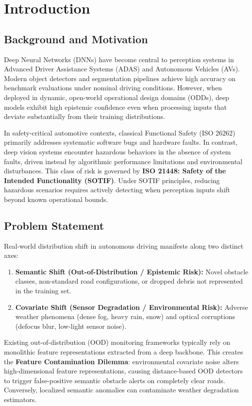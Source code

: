 \chapter{Introduction}
\label{ch:introduction}

\section{Background and Motivation}
Deep Neural Networks (DNNs) have become central to perception systems in Advanced Driver Assistance Systems (ADAS) and Autonomous Vehicles (AVs). Modern object detectors and segmentation pipelines achieve high accuracy on benchmark evaluations under nominal driving conditions. However, when deployed in dynamic, open-world operational design domains (ODDs), deep models exhibit high epistemic confidence even when processing inputs that deviate substantially from their training distributions.

In safety-critical automotive contexts, classical Functional Safety (ISO 26262) primarily addresses systematic software bugs and hardware faults. In contrast, deep vision systems encounter hazardous behaviors in the absence of system faults, driven instead by algorithmic performance limitations and environmental disturbances. This class of risk is governed by \textbf{ISO 21448: Safety of the Intended Functionality (SOTIF)}. Under SOTIF principles, reducing hazardous scenarios requires actively detecting when perception inputs shift beyond known operational bounds.

\section{Problem Statement}
Real-world distribution shift in autonomous driving manifests along two distinct axes:
\begin{enumerate}
    \item \textbf{Semantic Shift (Out-of-Distribution / Epistemic Risk):} Novel obstacle classes, non-standard road configurations, or dropped debris not represented in the training set.
    \item \textbf{Covariate Shift (Sensor Degradation / Environmental Risk):} Adverse weather phenomena (dense fog, heavy rain, snow) and optical corruptions (defocus blur, low-light sensor noise).
\end{enumerate}

Existing out-of-distribution (OOD) monitoring frameworks typically rely on monolithic feature representations extracted from a deep backbone. This creates the \textbf{Feature Contamination Dilemma}: environmental covariate noise alters high-dimensional feature representations, causing distance-based OOD detectors to trigger false-positive semantic obstacle alerts on completely clear roads. Conversely, localized semantic anomalies can contaminate weather degradation estimators. 

